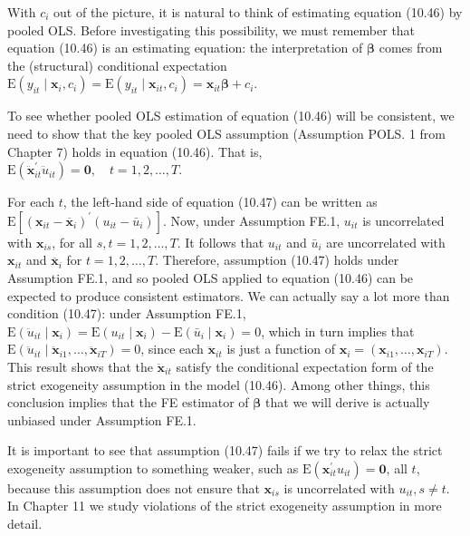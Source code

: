 \documentclass[10pt]{article}
\begin{document}
With $c_{i}$ out of the picture, it is natural to think of estimating equation (10.46) by pooled OLS. Before investigating this possibility, we must remember that equation (10.46) is an estimating equation: the interpretation of $\boldsymbol{\beta}$ comes from the (structural) conditional expectation $\mathrm{E}\left(y_{i t} \mid \mathbf{x}_{i}, c_{i}\right)=\mathrm{E}\left(y_{i t} \mid \mathbf{x}_{i t}, c_{i}\right)=\mathbf{x}_{i t} \boldsymbol{\beta}+c_{i}$.

To see whether pooled OLS estimation of equation (10.46) will be consistent, we need to show that the key pooled OLS assumption (Assumption POLS. 1 from Chapter 7) holds in equation (10.46). That is,\\
$\mathrm{E}\left(\ddot{\mathbf{x}}_{i t}^{\prime} \ddot{u}_{i t}\right)=\mathbf{0}, \quad t=1,2, \ldots, T$.

For each $t$, the left-hand side of equation (10.47) can be written as $\mathrm{E}\left[\left(\mathbf{x}_{i t}-\overline{\mathbf{x}}_{i}\right)^{\prime}\left(u_{i t}-\bar{u}_{i}\right)\right]$. Now, under Assumption FE.1, $u_{i t}$ is uncorrelated with $\mathbf{x}_{i s}$, for all $s, t=1,2, \ldots, T$. It follows that $u_{i t}$ and $\bar{u}_{i}$ are uncorrelated with $\mathbf{x}_{i t}$ and $\overline{\mathbf{x}}_{i}$ for $t=1,2, \ldots, T$. Therefore, assumption (10.47) holds under Assumption FE.1, and so pooled OLS applied to equation (10.46) can be expected to produce consistent estimators. We can actually say a lot more than condition (10.47): under Assumption FE.1, $\mathrm{E}\left(\ddot{u}_{i t} \mid \mathbf{x}_{i}\right)=\mathrm{E}\left(u_{i t} \mid \mathbf{x}_{i}\right)-\mathrm{E}\left(\bar{u}_{i} \mid \mathbf{x}_{i}\right)=0$, which in turn implies that $\mathrm{E}\left(\ddot{u}_{i t} \mid \ddot{\mathbf{x}}_{i 1}, \ldots, \ddot{\mathbf{x}}_{i T}\right)=0$, since each $\ddot{\mathbf{x}}_{i t}$ is just a function of $\mathbf{x}_{i}=\left(\mathbf{x}_{i 1}, \ldots, \mathbf{x}_{i T}\right)$. This result shows that the $\ddot{\mathbf{x}}_{i t}$ satisfy the conditional expectation form of the strict exogeneity assumption in the model (10.46). Among other things, this conclusion implies that the FE estimator of $\boldsymbol{\beta}$ that we will derive is actually unbiased under Assumption FE.1.

It is important to see that assumption (10.47) fails if we try to relax the strict exogeneity assumption to something weaker, such as $\mathrm{E}\left(\mathbf{x}_{i t}^{\prime} u_{i t}\right)=\mathbf{0}$, all $t$, because this assumption does not ensure that $\mathbf{x}_{i s}$ is uncorrelated with $u_{i t}, s \neq t$. In Chapter 11 we study violations of the strict exogeneity assumption in more detail.
\end{document}
